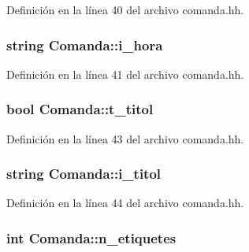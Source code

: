 Definición en la línea 40 del archivo comanda.\-hh.

\hypertarget{class_comanda_a480a34460b3668a5b4a1fa7e796632db}{
\subsubsection[{i\-\_\-hora}]{\setlength{\rightskip}{0pt plus 5cm}string Comanda\-::i\-\_\-hora\hspace{0.3cm}{\ttfamily [private]}}}\label{class_comanda_a480a34460b3668a5b4a1fa7e796632db}


Definición en la línea 41 del archivo comanda.\-hh.

\hypertarget{class_comanda_a08e8674396e2125cf8b2900f289713a7}{
\subsubsection[{t\-\_\-titol}]{\setlength{\rightskip}{0pt plus 5cm}bool Comanda\-::t\-\_\-titol\hspace{0.3cm}{\ttfamily [private]}}}\label{class_comanda_a08e8674396e2125cf8b2900f289713a7}


Definición en la línea 43 del archivo comanda.\-hh.

\hypertarget{class_comanda_aca04e90eab5ac14ddc3b25f154aabe48}{
\subsubsection[{i\-\_\-titol}]{\setlength{\rightskip}{0pt plus 5cm}string Comanda\-::i\-\_\-titol\hspace{0.3cm}{\ttfamily [private]}}}\label{class_comanda_aca04e90eab5ac14ddc3b25f154aabe48}


Definición en la línea 44 del archivo comanda.\-hh.

\hypertarget{class_comanda_a1e525815f0745140e05da2ebb96ec39a}{
\subsubsection[{n\-\_\-etiquetes}]{\setlength{\rightskip}{0pt plus 5cm}int Comanda\-::n\-\_\-etiquetes\hspace{0.3cm}{\ttfamily [private]}}}\label{class_comanda_a1e525815f0745140e05da2ebb96ec39a}


